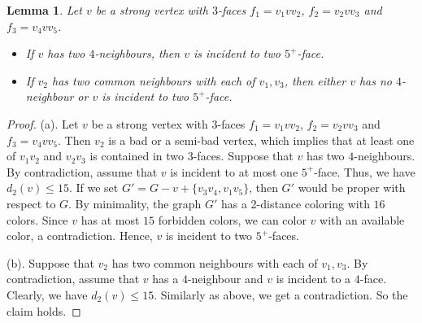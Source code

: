 \documentclass[12pt, reqno]{amsart}
\theoremstyle{plain}
\newtheorem{lemma}[equation]{Lemma}
\theoremstyle{definition}
\numberwithin{equation}{section}
\begin{document}
\begin{lemma}\label{lem:strong-properties}
Let $v$ be a strong vertex with $3$-faces $f_1=v_1vv_2$, $f_2=v_2vv_3$ and $f_3=v_4vv_5$. 
\begin{itemize}
\item[$(a)$] If $v$ has two $4$-neighbours, then $v$ is incident to two $5^+$-face.
\item[$(b)$] If $v_2$ has two common neighbours with each of $v_1,v_3$, then %
either $v$ has no $4$-neighbour or $v$ is incident to  two $5^+$-face. 
\end{itemize}
\end{lemma}
\begin{proof}
(a). Let $v$ be a strong vertex with $3$-faces $f_1=v_1vv_2$, $f_2=v_2vv_3$ and $f_3=v_4vv_5$. Then $v_2$ is a bad or a semi-bad vertex, which implies that at least one of $v_1v_2$ and $v_2v_3$ is contained in two $3$-faces. Suppose that $v$ has two $4$-neighbours.  By contradiction, assume that $v$ is incident to at most one $5^+$-face. Thus, we have  $d_2(v)\leq 15$. If we set $G'=G-v+\{v_3v_4,v_1v_5\}$, then $G'$ would be proper with respect to $G$.
By minimality, the graph $G'$ has a 2-distance coloring with $16$ colors. Since $v$ has at most $15$ forbidden colors, we can color $v$ with an available color, a contradiction. Hence, $v$ is incident to two $5^+$-faces.

(b). %
Suppose that $v_2$ has two common neighbours with each of $v_1,v_3$.  By contradiction, assume that $v$ has a $4$-neighbour and $v$ is incident to a $4$-face. Clearly, we have  $d_2(v)\leq 15$. %
Similarly as above, we get a contradiction. So the claim holds.
\end{proof}
\end{document}
